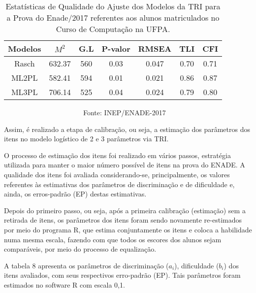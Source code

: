 \documentclass[12pt]{article}
\begin{document}
\begin{table}[htp]
	\centering
	\caption{Estatísticas de Qualidade do Ajuste dos Modelos da TRI para a Prova do Enade/2017 referentes aos alunos matriculados no Curso de Computação na UFPA.}
\begin{tabular}{c|c|c|c|c|c|c}
\hline\hline 
     Modelos        & $M^{2}$    & G.L  & P-valor & RMSEA  & TLI & CFI  \\
\hline\hline
 Rasch              &  632.37    & 560  &  0.03   &  0.047 & 0.70 & 0.71 \\
 ML2PL              &  582.41    & 594  &  0.01   &  0.021 & 0.86 & 0.87  \\
 ML3PL              &  706.14    & 525  &  0.04   &  0.024 & 0.79 & 0.80  \\
\hline\hline
\end{tabular}
\begin{flushleft}
\ \ \ \ \ \ \ \ \ \ \ \ \ \ \ \ \ \ \ \ \ \ \ Fonte: INEP/ENADE-2017
\end{flushleft}
\end{table}


Assim, é realizado a etapa de calibração, ou seja, a estimação dos parâmetros dos itens no modelo logístico de 2 e 3 parâmetros via TRI. 

O processo de estimação dos itens foi realizado em vários passos, estratégia utilizada para manter o maior número possível de itens na prova do ENADE. A qualidade dos itens foi avaliada considerando-se, principalmente, os valores referentes às estimativas dos parâmetros de discriminação e de dificuldade e, ainda, os erros-padrão (EP) destas estimativas.

Depois do primeiro passo, ou seja, após a primeira calibração (estimação) sem a retirada de itens, os parâmetros dos itens foram sendo novamente re-estimados por meio do programa R, que estima conjuntamente os itens e coloca a habilidade numa mesma escala, fazendo com que todos os escores dos alunos sejam comparáveis, por meio do processo de equalização.

A tabela 8 apresenta os parâmetros de discriminação ($a_{i}$), dificuldade ($b_{i}$) dos itens avaliados, com seus respectivos erro-padrão (EP). Tais parâmetros foram estimados no software R com escala 0,1.
\end{document}
